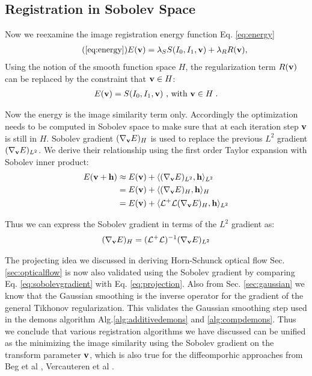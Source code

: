 \documentclass[letterpaper,12pt]{article}
\begin{document}
\subsection{Registration in Sobolev Space}

Now we reexamine the image registration energy function Eq. \ref{eq:energy}
\begin{align}
\tag{\ref{eq:energy}}
\myE(\v) = \lambda_S \myS(\I_0,\I_1,\v) + \lambda_R \myR(\v),
\end{align}
Using the notion of the smooth function space $H$, the regularization term $R(\mathbf{v})$ can be replaced by the constraint that $\mathbf{v} \in H$:
\begin{align}
\label{eq:sobolevenergy}
E(\mathbf{v}) = S(I_0,I_1,\mathbf{v}) \text{  , with }  \mathbf{v} \in H \; .
\end{align}

Now the energy is the image similarity term only. Accordingly the optimization needs to be computed in Sobolev space to make sure that at each iteration step $\mathbf{v}$ is still in $H$. Sobolev gradient $(\nabla_{\mathbf{v}} E)_H$ is used to replace the previous $L^2$ gradient $(\nabla_{\mathbf{v}} E)_{L^2}$. We derive their relationship using the first order Taylor expansion with Sobolev inner product:
\begin{equation}
\begin{split}
E(\mathbf{v} + \mathbf{h}) 
& \approx E(\mathbf{v}) + \langle (\nabla_{\mathbf{v}}E)_{L^2} , \mathbf{h} \rangle_{L^2} 
\\
& = E(\mathbf{v}) + \langle (\nabla_{\mathbf{v}}E)_{H} , \mathbf{h} \rangle_H
\\
& = E(\mathbf{v}) + \langle \mathcal{L}^+\mathcal{L} (\nabla_{\mathbf{v}}E)_{H}  , \mathbf{h} \rangle_{L^2}
\end{split}
\end{equation}

Thus we can express the Sobolev gradient in terms of the $L^2$ gradient as:
\begin{align}
\label{eq:sobolevgradient}
(\nabla_{\mathbf{v}}E)_{H} = (\mathcal{L}^+\mathcal{L})^{-1} (\nabla_{\mathbf{v}}E)_{L^2}
\end{align}

The projecting idea we discussed in deriving Horn-Schunck optical flow Sec. \ref{sec:opticalflow} is now also validated using the Sobolev gradient by comparing Eq. \ref{eq:sobolevgradient} with Eq. \ref{eq:projection}. Also from Sec. \ref{sec:gaussian} we know that the Gaussian smoothing is the inverse operator for the gradient of the general Tikhonov regularization. This validates the Gaussian smoothing step used in the demons algorithm Alg.\ref{alg:additivedemons} and \ref{alg:compdemons}. Thus we conclude that various registration algorithms we have discussed can be unified as the minimizing the image similarity using the Sobolev gradient on the transform parameter $\mathbf{v}$, which is also true for the diffeomporhic approaches from Beg et al \cite{Beg2005Computing}, Vercauteren et al \cite{Vercauteren2007, Vercauteren2008Symmetric}.
\end{document}
